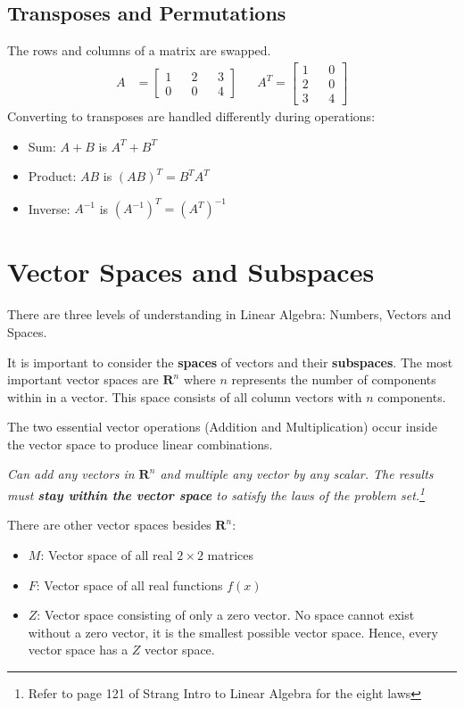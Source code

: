 \documentclass[10pt,a4paper]{article}
\begin{document}
\subsection{Transposes and Permutations}
The rows and columns of a matrix are swapped. 
\begin{align*} 
	A &=  \begin{bmatrix}
		1&&2&&3 \\
		0&&0&&4
	\end{bmatrix} && A^{T}=\begin{bmatrix}
		1&&0 \\
		2&&0 \\
		3&&4 
	\end{bmatrix}
\end{align*}
Converting to transposes are handled differently during operations:
\begin{itemize}
	\item Sum: $A+B$ is $A^T + B^T$
	\item Product: $AB$ is $(AB)^T = B^T A^T$
	\item Inverse: $A^{-1}$ is $(A^{-1})^T = (A^T)^{-1}$
\end{itemize}
\pagebreak

\section{Vector Spaces and Subspaces}
There are three levels of understanding in Linear Algebra: Numbers, Vectors and Spaces. \par 
It is important to consider the \textbf{spaces} of vectors and their \textbf{subspaces}.
The most important vector spaces are $\textbf{R}^n$ where $n$ represents the number of components
within in a vector. This space consists of all column vectors with $n$ components.\par 
The two essential vector operations (Addition and Multiplication) occur inside the vector space to
produce linear combinations. 
\begin{tcolorbox}[breakable,colback=white,colframe=black,width=\dimexpr\textwidth+12mm\relax,enlarge left by=-6mm]
		\textit{Can add any vectors in $\textbf{R}^n$ and multiple any vector by any scalar. The results must \textbf{stay within the vector space} to satisfy the laws of the problem set.\footnote{Refer to page 121 of Strang Intro to Linear Algebra for the eight laws}}
\end{tcolorbox}
There are other vector spaces besides $\textbf{R}^n$:
\begin{itemize}
	\item $M$: Vector space of all real $2\times 2$ matrices
	\item $F$: Vector space of all real functions $f(x)$
	\item $Z$: Vector space consisting of only a zero vector. No space cannot exist without a zero
	vector, it is the smallest possible vector space. Hence, every vector space has a $Z$ vector space.
\end{itemize}
\end{document}
